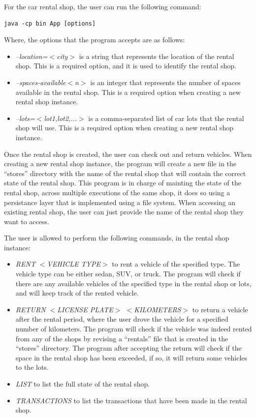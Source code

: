 \documentclass[conference]{IEEEtran}
\begin{document}
For the car rental shop, the user can run the following command:
\begin{lstlisting}[style=input]
java -cp bin App [options]
\end{lstlisting}

Where, the options that the program accepts are as follows:
\begin{itemize}
    \item \textit{--location=$<$city$>$} is a string that represents the location of the rental shop. This is a required option, and it is used to identify the rental shop.
    \item \textit{--spaces-available$<$n$>$} is an integer that represents the number of spaces available in the rental shop. This is a required option when creating a new rental shop instance.
    \item \textit{--lots=$<$lot1,lot2,...$>$} is a comma-separated list of car lots that the rental shop will use. This is a required option when creating a new rental shop instance.
\end{itemize}

Once the rental shop is created, the user can check out and return vehicles. When creating a new rental shop instance, the program will create a new file in the ``stores'' directory with the name of the rental shop that will contain the correct state of the rental shop. This program is in charge of mainting the state of the rental shop, across multiple executions of the same shop, it does so using a persistance layer that is implemented using a file system. When accessing an existing rental shop, the user can just provide the name of the rental shop they want to access. 

The user is allowed to perform the following commands, in the rental shop instance:
\begin{itemize}
    \item \textit{RENT $<$VEHICLE TYPE$>$} to rent a vehicle of the specified type. The vehicle type can be either sedan, SUV, or truck. The program will check if there are any available vehicles of the specified type in the rental shop or lots, and will keep track of the rented vehicle. 
    \item \textit{RETURN $<$LICENSE PLATE$>$ $<$KILOMETERS$>$} to return a vehicle after the rental period, where the user drove the vehicle for a specified number of kilometers. The program will check if the vehicle was indeed rented from any of the shops by revising a ``rentals'' file that is created in the ``stores'' directory. The program after accepting the return will check if the space in the rental shop has been exceeded, if so, it will return some vehicles to the lots. 
    \item \textit{LIST} to list the full state of the rental shop. 
    \item \textit{TRANSACTIONS} to list the transactions that have been made in the rental shop.
\end{itemize}
\end{document}
